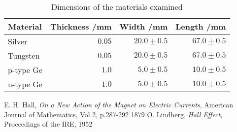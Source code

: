 \documentclass[a4paper]{article}
\begin{document}
	\begin{table}[h]
		\begin{center}
			\begin{tabular}{|l|r|r|r|} 
			\hline
			Material  & Thickness /mm & Width /mm    & Length /mm   \\ \hline
			Silver    & $0.05$        & $20.0\pm0.5$ & $67.0\pm0.5$ \\
			Tungsten  & $0.05$        & $20.0\pm0.5$ & $67.0\pm0.5$ \\
			p-type Ge & $1.0$         & $5.0\pm0.5$      & $10.0\pm0.5$ \\
			n-type Ge & $1.0$         & $5.0\pm0.5$      & $10.0\pm0.5$ \\ \hline	
			\end{tabular}
		\end{center}
		\caption{Dimensions of the materials examined}
		\label{table:dimensions}
	\end{table}
	
	\clearpage
	\newpage
	\begin{thebibliography}{9}
			E. H. Hall,
			\emph{On a New Action of the Magnet on Electric Currents},
			American Journal of Mathematics, Vol 2, p.287-292
			1879
			O. Lindberg,
			\emph{Hall Effect},
			Proceedings of the IRE,
			1952
	\end{thebibliography}
\end{document}
